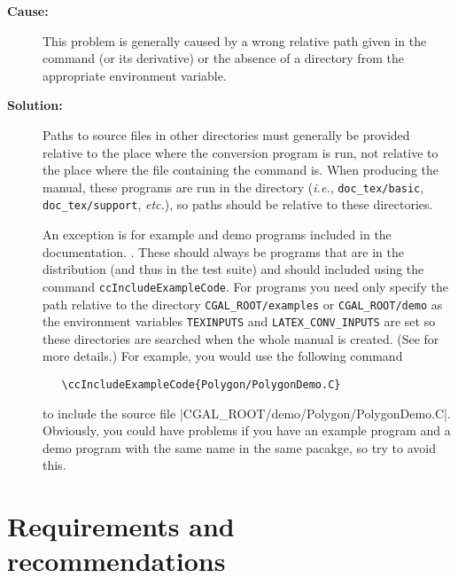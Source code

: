 \begin{description}
\item[{\bf Cause:}] This problem is generally caused by a wrong relative path
given in the \verb|| command (or its derivative) or the absence of a 
directory from the appropriate environment variable.

\item[{\bf Solution:}] Paths to source files in other directories must 
generally be provided relative to the place where the conversion program is 
run, not relative to the place where the file containing the command is.  When 
producing the manual, these programs are run in the  
directory ({\em i.e.}, {\tt doc\_tex/basic}, {\tt doc\_tex/support}, 
{\em etc.}), so paths should be relative to these directories.  

An exception is for example and demo programs included in the documentation.
.  These should always
be programs that are in the distribution (and thus in the test suite)
and should included using the command \texttt{ccIncludeExampleCode}.  For 
programs you need only specify the path relative to the directory 
\texttt{CGAL\_ROOT/examples} or \texttt{CGAL\_ROOT/demo} as the environment 
variables \texttt{TEXINPUTS} and \texttt{LATEX\_CONV\_INPUTS} are set so these 
directories are searched when the whole manual is created.  
(See
for more details.)
For example,
you would use the following command
\begin{verbatim}
   \ccIncludeExampleCode{Polygon/PolygonDemo.C}
\end{verbatim}
to include the source file \nonlinkedpath|CGAL_ROOT/demo/Polygon/PolygonDemo.C|.
Obviously, you could have problems if you have an example program and a demo
program with the same name in the same pacakge, so try to avoid this.
\end{description}

\section{Requirements and recommendations}
\label{sec:specification_req_and_rec}

